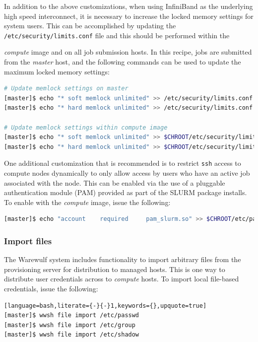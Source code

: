 \documentclass[letterpaper]{article}
\begin{document}
In addition to the above customizations, when using InfiniBand as the
underlying high speed interconnect, it is necessary to increase the locked
memory settings for system users. This can be accomplished by updating the
\texttt{/etc/security/limits.conf} file and this should be performed within
the {{\em compute} image and on all job submission hosts. In this recipe, jobs
  are submitted from the {\em master} host, and the following commands can be
  used to update the maximum locked memory settings:

\begin{lstlisting}[language=bash,keywords={},upquote=true]
# Update memlock settings on master
[master]$ echo "* soft memlock unlimited" >> /etc/security/limits.conf
[master]$ echo "* hard memlock unlimited" >> /etc/security/limits.conf

# Update memlock settings within compute image
[master]$ echo "* soft memlock unlimited" >> $CHROOT/etc/security/limits.conf
[master]$ echo "* hard memlock unlimited" >> $CHROOT/etc/security/limits.conf
\end{lstlisting}

One additional customization that is recommended is to restrict \texttt{ssh} access to
compute nodes dynamically to only allow access by users who have an
active job associated with the node. This can be enabled via the use of a
pluggable authentication module (PAM) provided as part of the SLURM package
installs. To enable with the {\em compute} image, issue the following:

\begin{lstlisting}[language=bash,keywords={},upquote=true]
[master]$ echo "account    required     pam_slurm.so" >> $CHROOT/etc/pam.d/sshd
\end{lstlisting}

\subsubsection{Import files} \label{sec:file_import}

The Warewulf system includes functionality to import arbitrary files from the
provisioning server for distribution to managed hosts. This is one way
to distribute user credentials across to {\em compute} hosts. To
import local file-based credentials, issue the following:

\begin{lstlisting}[language=bash,literate={-}{-}1,keywords={},upquote=true]
[master]$ wwsh file import /etc/passwd                                                                                                       
[master]$ wwsh file import /etc/group
[master]$ wwsh file import /etc/shadow 
\end{lstlisting}

}
\end{document}
